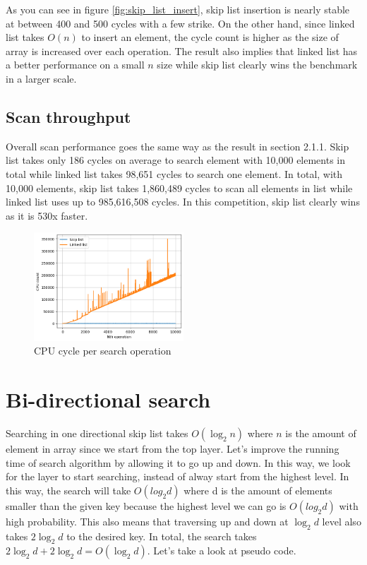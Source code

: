 \documentclass[a4paper, 12pt]{report}
\begin{document}
As you can see in figure \ref{fig:skip_list_insert}, skip list insertion is nearly stable at between 400 and 500 cycles with a few strike.
On the other hand, since linked list takes $O(n)$ to insert an element, the cycle count is higher as the size of array is increased over each operation.
The result also implies that linked list has a better performance on a small $n$ size while skip list clearly wins the benchmark in a larger scale.

\subsection{Scan throughput}
Overall scan performance goes the same way as the result in section 2.1.1. Skip list takes only 186 cycles on average to search element with 10,000 elements in total
while linked list takes 98,651 cycles to search one element. In total, with 10,000 elements, skip list takes 1,860,489 cycles to scan all elements in list while linked list
uses up to 985,616,508 cycles. In this competition, skip list clearly wins as it is 530x faster.

\begin{figure}[h]
        \centering
        \includegraphics[width=0.5\textwidth,scale=0.5]{skip_list_scan.png}
        \caption{\label{fig:skip_list_scan} CPU cycle per search operation}
\end{figure}

\section{Bi-directional search}

Searching in one directional skip list takes $O(\log_2 n)$ where $n$ is the amount of element in array since we start from the top layer.
Let's improve the running time of search algorithm by allowing it to go up and down. In this way, we look for the layer to start searching, 
instead of alway start from the highest level. In this way, the search will take $O(log_2 d)$ where d is the amount of elements smaller than the given key
because the highest level we can go is $O(log_2 d)$ with high probability. This also means that traversing up and down at $\log_2 d$ level also takes 
$2\log_2 d$ to the desired key. In total, the search takes $2\log_2 d + 2\log_2 d = O(\log_2 d)$. Let's take a look at pseudo code.
\end{document}
